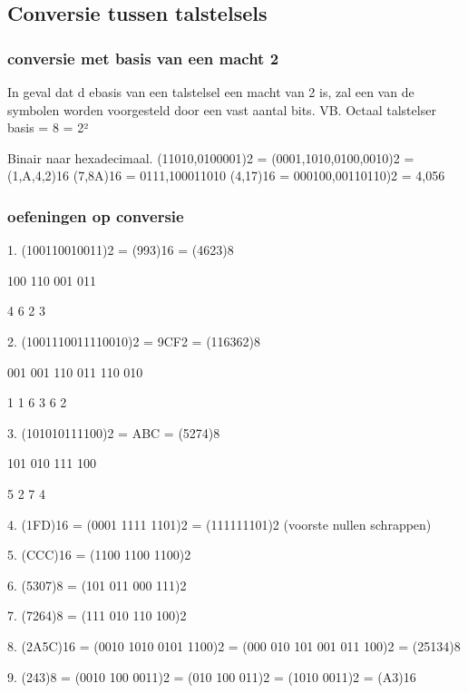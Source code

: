 \documentclass{article}
\begin{document}
\subsection{Conversie tussen talstelsels}
\subsubsection{conversie met basis van een macht 2}
In geval dat d ebasis van een talstelsel een macht van 2 is, zal een van de symbolen worden voorgesteld door een vast aantal bits.
VB.
Octaal talstelser basis = 8 = 2²

Binair naar hexadecimaal. (11010,0100001)2 = (0001,1010,0100,0010)2 = (1,A,4,2)16 
(7,8A)16 = 0111,100011010 
(4,17)16 = 000100,00110110)2 = 4,056

\subsubsection{oefeningen op conversie}

1. (100110010011)2 = (993)16 = (4623)8

100 110 001 011

4 6 2 3

2. (1001110011110010)2 = 9CF2 = (116362)8

001 001 110 011 110 010

1 1 6 3 6 2

3. (101010111100)2 = ABC = (5274)8

101 010 111 100

5 2 7 4

4. (1FD)16 = (0001 1111 1101)2 = (111111101)2 (voorste nullen schrappen)

5. (CCC)16 = (1100 1100 1100)2

6. (5307)8 = (101 011 000 111)2

7. (7264)8 = (111 010 110 100)2

8. (2A5C)16 = (0010 1010 0101 1100)2 = (000 010 101 001 011 100)2 = (25134)8

9. (243)8 = (0010 100 0011)2 = (010 100 011)2 = (1010 0011)2 = (A3)16
\end{document}
